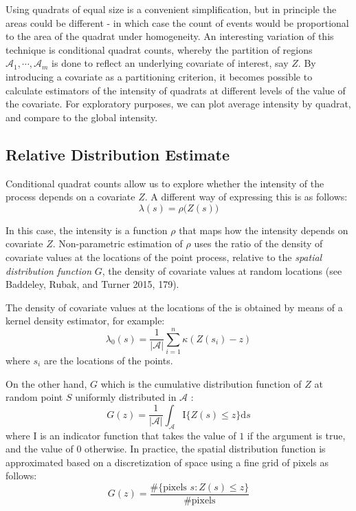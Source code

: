 \documentclass[smallextended]{svjour3}       %
\begin{document}
Using quadrats of equal size is a convenient simplification, but in
principle the areas could be different - in which case the count of
events would be proportional to the area of the quadrat under
homogeneity. An interesting variation of this technique is conditional
quadrat counts, whereby the partition of regions
\(\mathcal{A}_1,\cdots,\mathcal{A}_m\) is done to reflect an underlying
covariate of interest, say \(Z\). By introducing a covariate as a
partitioning criterion, it becomes possible to calculate estimators of
the intensity of quadrats at different levels of the value of the
covariate. For exploratory purposes, we can plot average intensity by
quadrat, and compare to the global intensity.

\hypertarget{relative-distribution-estimate}{%
\subsection{Relative Distribution
Estimate}\label{relative-distribution-estimate}}

Conditional quadrat counts allow us to explore whether the intensity of
the process depends on a covariate \(Z\). A different way of expressing
this is as follows: \[
\lambda(s)=\rho\big(Z(s)\big)
\]

In this case, the intensity is a function \(\rho\) that maps how the
intensity depends on covariate \(Z\). Non-parametric estimation of
\(\rho\) uses the ratio of the density of covariate values at the
locations of the point process, relative to the \emph{spatial
distribution function} \(G\), the density of covariate values at random
locations (see Baddeley, Rubak, and Turner 2015, 179).

The density of covariate values at the locations of the is obtained by
means of a kernel density estimator, for example: \[
\lambda_0(s) = \frac{1}{|\mathcal{A}|}\sum_{i = 1}^n\kappa(Z(s_i) - z)
\] where \(s_i\) are the locations of the points.

On the other hand, \(G\) which is the cumulative distribution function
of \(Z\) at random point \(S\) uniformly distributed in \(\mathcal{A}\)
: \[
G(z) = \frac{1}{|\mathcal{A}|} \int_{\mathcal{A}}\text{I}\{Z(s)\leq z\}\text{d}s
\] where \(\text{I}\) is an indicator function that takes the value of
\(1\) if the argument is true, and the value of \(0\) otherwise. In
practice, the spatial distribution function is approximated based on a
discretization of space using a fine grid of pixels as follows: \[
G(z) = \frac{\#\{\text{pixels }s:Z(s)\leq z\}}{\# \text{pixels}}
\]
\end{document}
